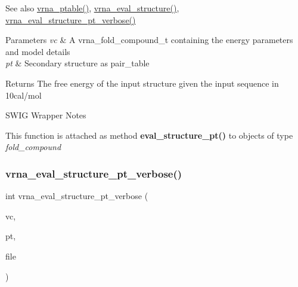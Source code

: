 \begin{DoxySeeAlso}{See also}
\hyperlink{group__struct__utils_gae829fb8bb7f694c12a9c0bbc34c77c60}{vrna\+\_\+ptable()}, \hyperlink{group__eval_ga58f199f1438d794a265f3b27fc8ea631}{vrna\+\_\+eval\+\_\+structure()}, \hyperlink{group__eval_ga8a517cfeeae8c376ae7b1e0c401d38b4}{vrna\+\_\+eval\+\_\+structure\+\_\+pt\+\_\+verbose()}
\end{DoxySeeAlso}

\begin{DoxyParams}{Parameters}
{\em vc} & A vrna\+\_\+fold\+\_\+compound\+\_\+t containing the energy parameters and model details \\
\hline
{\em pt} & Secondary structure as pair\+\_\+table \\
\hline
\end{DoxyParams}
\begin{DoxyReturn}{Returns}
The free energy of the input structure given the input sequence in 10cal/mol
\end{DoxyReturn}
\begin{DoxyRefDesc}{S\+W\+I\+G Wrapper Notes}
\item[\hyperlink{wrappers__wrappers000026}{S\+W\+I\+G Wrapper Notes}]This function is attached as method {\bfseries eval\+\_\+structure\+\_\+pt()} to objects of type {\itshape fold\+\_\+compound} \end{DoxyRefDesc}
\mbox{\label{group__eval_ga8a517cfeeae8c376ae7b1e0c401d38b4}} 
\subsubsection{\texorpdfstring{vrna\+\_\+eval\+\_\+structure\+\_\+pt\+\_\+verbose()}{vrna\_eval\_structure\_pt\_verbose()}}
{\footnotesize\ttfamily int vrna\+\_\+eval\+\_\+structure\+\_\+pt\+\_\+verbose (\begin{DoxyParamCaption}\item[{\hyperlink{group__fold__compound_ga1b0cef17fd40466cef5968eaeeff6166}{vrna\+\_\+fold\+\_\+compound\+\_\+t} $\ast$}]{vc,  }\item[{const short $\ast$}]{pt,  }\item[{F\+I\+LE $\ast$}]{file }\end{DoxyParamCaption})}




